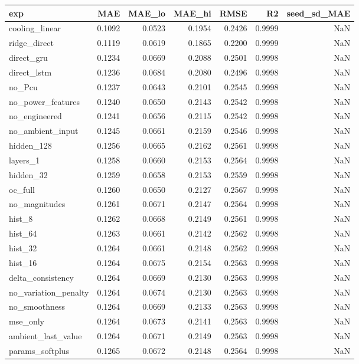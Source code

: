 \begin{tabular}{lrrrrrr}
\toprule
exp & MAE & MAE\_lo & MAE\_hi & RMSE & R2 & seed\_sd\_MAE \\
\midrule
cooling\_linear & 0.1092 & 0.0523 & 0.1954 & 0.2426 & 0.9999 & NaN \\
ridge\_direct & 0.1119 & 0.0619 & 0.1865 & 0.2200 & 0.9999 & NaN \\
direct\_gru & 0.1234 & 0.0669 & 0.2088 & 0.2501 & 0.9998 & NaN \\
direct\_lstm & 0.1236 & 0.0684 & 0.2080 & 0.2496 & 0.9998 & NaN \\
no\_Pcu & 0.1237 & 0.0643 & 0.2101 & 0.2545 & 0.9998 & NaN \\
no\_power\_features & 0.1240 & 0.0650 & 0.2143 & 0.2542 & 0.9998 & NaN \\
no\_engineered & 0.1241 & 0.0656 & 0.2115 & 0.2542 & 0.9998 & NaN \\
no\_ambient\_input & 0.1245 & 0.0661 & 0.2159 & 0.2546 & 0.9998 & NaN \\
hidden\_128 & 0.1256 & 0.0665 & 0.2162 & 0.2561 & 0.9998 & NaN \\
layers\_1 & 0.1258 & 0.0660 & 0.2153 & 0.2564 & 0.9998 & NaN \\
hidden\_32 & 0.1259 & 0.0658 & 0.2153 & 0.2559 & 0.9998 & NaN \\
oc\_full & 0.1260 & 0.0650 & 0.2127 & 0.2567 & 0.9998 & NaN \\
no\_magnitudes & 0.1261 & 0.0671 & 0.2147 & 0.2564 & 0.9998 & NaN \\
hist\_8 & 0.1262 & 0.0668 & 0.2149 & 0.2561 & 0.9998 & NaN \\
hist\_64 & 0.1263 & 0.0661 & 0.2142 & 0.2562 & 0.9998 & NaN \\
hist\_32 & 0.1264 & 0.0661 & 0.2148 & 0.2562 & 0.9998 & NaN \\
hist\_16 & 0.1264 & 0.0675 & 0.2154 & 0.2563 & 0.9998 & NaN \\
delta\_consistency & 0.1264 & 0.0669 & 0.2130 & 0.2563 & 0.9998 & NaN \\
no\_variation\_penalty & 0.1264 & 0.0674 & 0.2130 & 0.2563 & 0.9998 & NaN \\
no\_smoothness & 0.1264 & 0.0669 & 0.2133 & 0.2563 & 0.9998 & NaN \\
mse\_only & 0.1264 & 0.0673 & 0.2141 & 0.2563 & 0.9998 & NaN \\
ambient\_last\_value & 0.1264 & 0.0671 & 0.2149 & 0.2563 & 0.9998 & NaN \\
params\_softplus & 0.1265 & 0.0672 & 0.2148 & 0.2564 & 0.9998 & NaN \\

\end{tabular}
